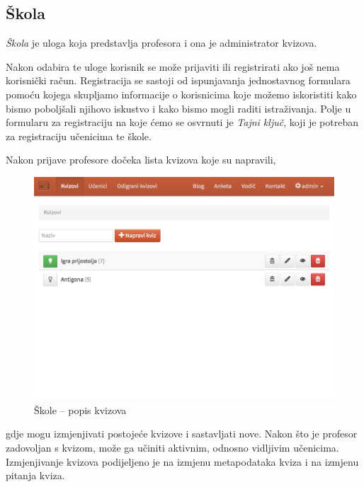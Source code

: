 \documentclass{scrreprt}
\begin{document}
\subsection{Škola}

\emph{Škola} je uloga koja predstavlja profesora i ona je administrator kvizova.


Nakon odabira te uloge korisnik se može prijaviti ili registrirati ako još nema
korisnički račun. Registracija se sastoji od ispunjavanja jednostavnog formulara
pomoću kojega skupljamo informacije o korisnicima koje možemo iskoristiti kako
bismo poboljšali njihovo iskustvo i kako bismo mogli raditi istraživanja. Polje
u formularu za registraciju na koje ćemo se osvrnuti je \emph{Tajni ključ}, koji
je potreban za registraciju učenicima te škole.

Nakon prijave profesore dočeka lista kvizova koje su napravili,

\begin{figure}[H]
  \includegraphics[width=\textwidth, clip=true, trim=0 10cm 0 0, fbox]{school/quizzes}
  \caption{Škole -- popis kvizova}
\end{figure}

gdje mogu izmjenjivati postojeće kvizove i sastavljati nove. Nakon što je
profesor zadovoljan s kvizom, može ga učiniti aktivnim, odnosno vidljivim
učenicima. Izmjenjivanje kvizova podijeljeno je na izmjenu metapodataka kviza i
na izmjenu pitanja kviza.
\end{document}
